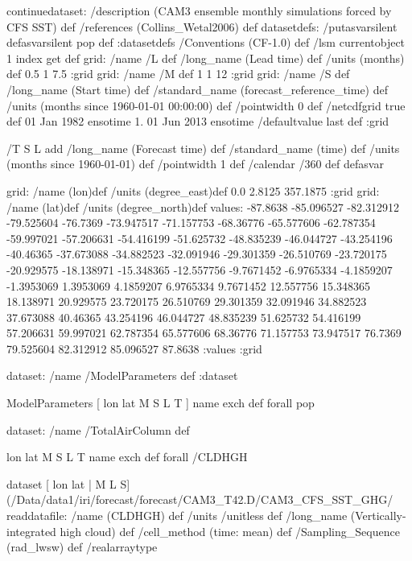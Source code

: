

\begin{ingrid}
continuedataset:
/description (CAM3 ensemble monthly simulations forced by CFS SST) def
/references (Collins_Wetal2006) def
datasetdefs:
/putasvarsilent { defasvarsilent pop } def
:datasetdefs
/Conventions (CF-1.0) def
/lsm currentobject 1 index get def
grid:
/name /L def
/long_name (Lead time) def
/units (months) def
0.5 1 7.5
:grid
grid:
/name /M def
1 1 12
:grid
grid:
/name /S def
/long_name (Start time) def
/standard_name (forecast_reference_time) def
/units (months since 1960-01-01 00:00:00) def
/pointwidth 0 def 
/netcdfgrid true def
01 Jan 1982 ensotime
1.
01 Jun 2013 ensotime
/defaultvalue {last} def
:grid

/T { 
S L add
/long_name (Forecast time) def
/standard_name (time) def
/units (months since 1960-01-01) def
/pointwidth 1 def
/calendar /360 def
 }defasvar



grid:
/name (lon)def
/units (degree_east)def
 0.0 2.8125 357.1875
:grid
grid:
/name (lat)def
/units (degree_north)def
values: -87.8638 -85.096527 -82.312912 -79.525604 -76.7369 -73.947517 -71.157753 -68.36776 -65.577606 -62.787354 -59.997021 -57.206631 -54.416199 -51.625732 -48.835239 -46.044727 -43.254196 -40.46365 -37.673088 -34.882523 -32.091946 -29.301359 -26.510769 -23.720175 -20.929575 -18.138971 -15.348365 -12.557756 -9.7671452 -6.9765334 -4.1859207 -1.3953069 1.3953069 4.1859207 6.9765334 9.7671452 12.557756 15.348365 18.138971 20.929575 23.720175 26.510769 29.301359 32.091946 34.882523 37.673088 40.46365 43.254196 46.044727 48.835239 51.625732 54.416199 57.206631 59.997021 62.787354 65.577606 68.36776 71.157753 73.947517 76.7369 79.525604 82.312912 85.096527 87.8638 :values
:grid


dataset: /name /ModelParameters def :dataset

ModelParameters  [ lon lat M S L T ] { name exch def } forall pop

dataset: /name /TotalAirColumn def

 { lon lat M S L T } { name exch def } forall 
 /CLDHGH {
dataset
[ lon lat | M L S] 
(/Data/data1/iri/forecast/forecast/CAM3_T42.D/CAM3_CFS_SST_GHG/%
readdatafile:
/name (CLDHGH) def
/units /unitless def
/long_name (Vertically-integrated high cloud) def
/cell_method (time: mean) def
/Sampling_Sequence (rad_lwsw) def
/realarraytype 

}
\end{ingrid}
